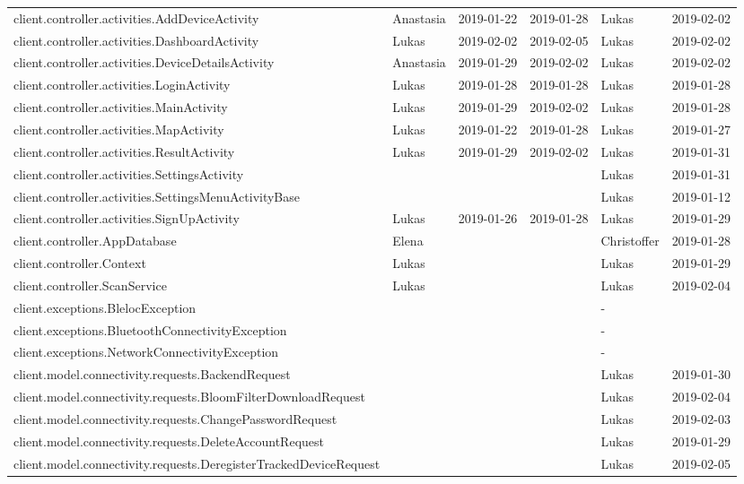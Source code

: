 \begin{adjustbox}{totalheight=\baselineskip}
\begin{tabular}{ l l r r l r }
client.controller.activities.AddDeviceActivity & Anastasia & 2019-01-22 & 2019-01-28 & Lukas & 2019-02-02 \\
client.controller.activities.DashboardActivity & Lukas & 2019-02-02 & 2019-02-05 & Lukas & 2019-02-02 \\
client.controller.activities.DeviceDetailsActivity & Anastasia & 2019-01-29 & 2019-02-02 & Lukas & 2019-02-02 \\
client.controller.activities.LoginActivity & Lukas & 2019-01-28 & 2019-01-28 & Lukas & 2019-01-28 \\
client.controller.activities.MainActivity & Lukas & 2019-01-29 & 2019-02-02 & Lukas & 2019-01-28 \\
client.controller.activities.MapActivity & Lukas & 2019-01-22 & 2019-01-28 & Lukas & 2019-01-27 \\
client.controller.activities.ResultActivity & Lukas & 2019-01-29 & 2019-02-02 & Lukas & 2019-01-31 \\
client.controller.activities.SettingsActivity &  &  &  & Lukas & 2019-01-31 \\
client.controller.activities.SettingsMenuActivityBase &  &  &  & Lukas & 2019-01-12 \\
client.controller.activities.SignUpActivity & Lukas & 2019-01-26 & 2019-01-28 & Lukas & 2019-01-29 \\
client.controller.AppDatabase & Elena &  &  & Christoffer & 2019-01-28 \\
client.controller.Context & Lukas &  &  & Lukas & 2019-01-29 \\
client.controller.ScanService & Lukas &  &  & Lukas & 2019-02-04 \\
client.exceptions.BlelocException &  &  &  & - &  \\
client.exceptions.BluetoothConnectivityException &  &  &  & - &  \\
client.exceptions.NetworkConnectivityException &  &  &  & - &  \\
client.model.connectivity.requests.BackendRequest &  &  &  & Lukas & 2019-01-30 \\
client.model.connectivity.requests.BloomFilterDownloadRequest &  &  &  & Lukas & 2019-02-04 \\
client.model.connectivity.requests.ChangePasswordRequest &  &  &  & Lukas & 2019-02-03 \\
client.model.connectivity.requests.DeleteAccountRequest &  &  &  & Lukas & 2019-01-29 \\
client.model.connectivity.requests.DeregisterTrackedDeviceRequest &  &  &  & Lukas & 2019-02-05 \\

\end{tabular}
\end{adjustbox}
